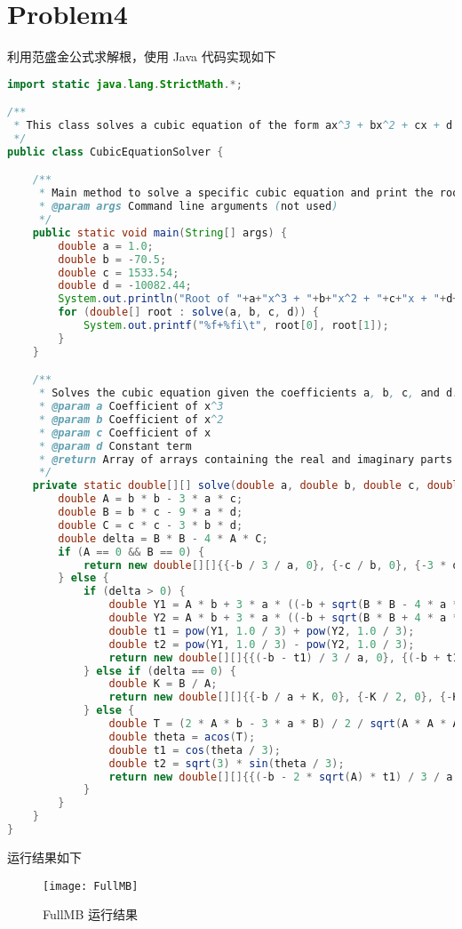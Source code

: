 \documentclass[UTF8]{ctexart}
\begin{document}
    \section{Problem4}\label{sec:problem4}
    利用范盛金公式求解根，使用 Java 代码实现如下
    \begin{lstlisting}[language=Java, breaklines = true,label={lst:lstlisting4}]
import static java.lang.StrictMath.*;

/**
 * This class solves a cubic equation of the form ax^3 + bx^2 + cx + d = 0 using Cardano's method.
 */
public class CubicEquationSolver {

    /**
     * Main method to solve a specific cubic equation and print the roots.
     * @param args Command line arguments (not used)
     */
    public static void main(String[] args) {
        double a = 1.0;
        double b = -70.5;
        double c = 1533.54;
        double d = -10082.44;
        System.out.println("Root of "+a+"x^3 + "+b+"x^2 + "+c+"x + "+d+" = 0");
        for (double[] root : solve(a, b, c, d)) {
            System.out.printf("%f+%fi\t", root[0], root[1]);
        }
    }

    /**
     * Solves the cubic equation given the coefficients a, b, c, and d.
     * @param a Coefficient of x^3
     * @param b Coefficient of x^2
     * @param c Coefficient of x
     * @param d Constant term
     * @return Array of arrays containing the real and imaginary parts of the roots
     */
    private static double[][] solve(double a, double b, double c, double d) {
        double A = b * b - 3 * a * c;
        double B = b * c - 9 * a * d;
        double C = c * c - 3 * b * d;
        double delta = B * B - 4 * A * C;
        if (A == 0 && B == 0) {
            return new double[][]{{-b / 3 / a, 0}, {-c / b, 0}, {-3 * d / c, 0}};
        } else {
            if (delta > 0) {
                double Y1 = A * b + 3 * a * ((-b + sqrt(B * B - 4 * a * c)) / 2);
                double Y2 = A * b + 3 * a * ((-b + sqrt(B * B + 4 * a * c)) / 2);
                double t1 = pow(Y1, 1.0 / 3) + pow(Y2, 1.0 / 3);
                double t2 = pow(Y1, 1.0 / 3) - pow(Y2, 1.0 / 3);
                return new double[][]{{(-b - t1) / 3 / a, 0}, {(-b + t1 / 2) / 3 / a, (-b + t2 * sqrt(3) / 2) / 3 / a}, {(-b + t1 / 2) / 3 / a, -(-b + t2 * sqrt(3) / 2) / 3 / a}};
            } else if (delta == 0) {
                double K = B / A;
                return new double[][]{{-b / a + K, 0}, {-K / 2, 0}, {-K / 2, 0}};
            } else {
                double T = (2 * A * b - 3 * a * B) / 2 / sqrt(A * A * A);
                double theta = acos(T);
                double t1 = cos(theta / 3);
                double t2 = sqrt(3) * sin(theta / 3);
                return new double[][]{{(-b - 2 * sqrt(A) * t1) / 3 / a, 0}, {(-b + sqrt(A) * (t1 + t2)) / 3 / a, 0}, {(-b + sqrt(A) * (t1 - t2)) / 3 / a, 0}};
            }
        }
    }
}
    \end{lstlisting}
    运行结果如下
    \begin{figure}[h]
        \centering
        \texttt{[image: FullMB]}
        \caption{FullMB 运行结果}\label{fig:figure4}
    \end{figure}
\end{document}
